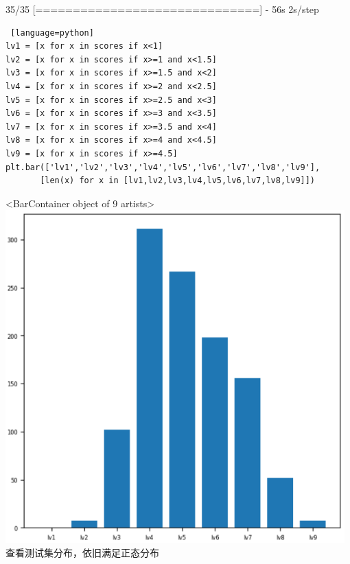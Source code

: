 \documentclass{article}
\begin{document}
35/35 [==============================] - 56s 2s/step
\begin{lstlisting} [language=python]
lv1 = [x for x in scores if x<1]
lv2 = [x for x in scores if x>=1 and x<1.5]
lv3 = [x for x in scores if x>=1.5 and x<2]
lv4 = [x for x in scores if x>=2 and x<2.5]
lv5 = [x for x in scores if x>=2.5 and x<3]
lv6 = [x for x in scores if x>=3 and x<3.5]
lv7 = [x for x in scores if x>=3.5 and x<4]
lv8 = [x for x in scores if x>=4 and x<4.5]
lv9 = [x for x in scores if x>=4.5]
plt.bar(['lv1','lv2','lv3','lv4','lv5','lv6','lv7','lv8','lv9'],
       [len(x) for x in [lv1,lv2,lv3,lv4,lv5,lv6,lv7,lv8,lv9]])
\end{lstlisting}
<BarContainer object of 9 artists>\\
\includegraphics[width=0.98\textwidth]{7.png}\\
查看测试集分布，依旧满足正态分布
\end{document}
